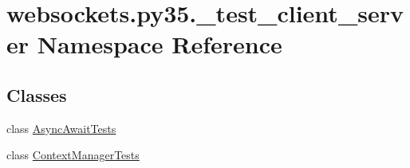 \hypertarget{namespacewebsockets_1_1py35_1_1__test__client__server}{}\section{websockets.\+py35.\+\_\+test\+\_\+client\+\_\+server Namespace Reference}
\label{namespacewebsockets_1_1py35_1_1__test__client__server}
\subsection*{Classes}
\begin{DoxyCompactItemize}
\item 
class \hyperlink{classwebsockets_1_1py35_1_1__test__client__server_1_1_async_await_tests}{Async\+Await\+Tests}
\item 
class \hyperlink{classwebsockets_1_1py35_1_1__test__client__server_1_1_context_manager_tests}{Context\+Manager\+Tests}
\end{DoxyCompactItemize}
